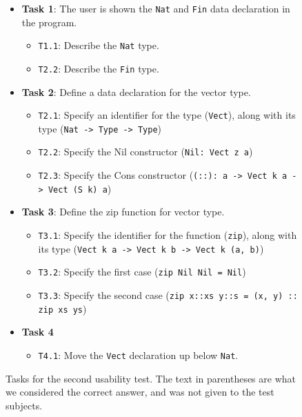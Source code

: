 \begin{figure}
\centering
\begin{itemize}
	\item \textbf{Task 1}: The user is shown the \texttt{Nat} and \texttt{Fin} data declaration in the program.
	\begin{itemize}
		\item \texttt{T1.1}: Describe the \texttt{Nat} type.
		\item \texttt{T2.2}: Describe the \texttt{Fin} type.
	\end{itemize}
	\item \textbf{Task 2}: Define a data declaration for the vector type.
	\begin{itemize}
		\item \texttt{T2.1}: Specify an identifier for the type (\texttt{Vect}), along with its type (\texttt{Nat -> Type -> Type})
		\item \texttt{T2.2}: Specify the Nil constructor (\texttt{Nil: Vect z a})
		\item \texttt{T2.3}: Specify the Cons constructor (\texttt{(::): a -> Vect k a -> Vect (S k) a})
	\end{itemize}
	\item \textbf{Task 3}: Define the zip function for vector type.
	\begin{itemize}
		\item \texttt{T3.1}: Specify the identifier for the function (\texttt{zip}), along with its type (\texttt{Vect k a -> Vect k b -> Vect k (a, b)})
		\item \texttt{T3.2}: Specify the first case (\texttt{zip Nil Nil = Nil})
		\item \texttt{T3.3}: Specify the second case (\texttt{zip x::xs y::s = (x, y) :: zip xs ys})
	\end{itemize}
	\item \textbf{Task 4}
	\begin{itemize}
		\item \texttt{T4.1}: Move the \texttt{Vect} declaration up below \texttt{Nat}.
	\end{itemize}
\end{itemize}
\caption{Tasks for the second usability test. The text in parentheses are what we considered the correct answer, and was not given to the test subjects.}
\label{figure:second_tasks}
\end{figure}

